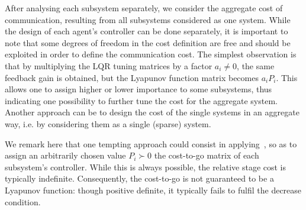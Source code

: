 \documentclass[letterpaper, 10 pt, conference]{ieeeconf}  %
\newtheorem{Proposition}[Theorem]{Propositon}
\begin{document}
After analysing each subsystem separately, we consider the aggregate cost of communication, resulting from all subsystems considered as one system. While the design of each agent's controller can be done separately, it is important to note that some degrees of freedom in the cost definition are free and should be exploited in order to define the communication cost. 
The simplest observation is that by multiplying the LQR tuning matrices by a factor $a_i \neq 0$, the same feedback gain is obtained, but the Lyapunov function matrix becomes $a_i P_i$. This allows one to assign higher or lower importance to some subsystems, thus indicating one possibility to further tune the cost for the aggregate system. Another approach can be to design the cost of the single systems in an aggregate way, i.e. by considering them as a single (sparse) system.

We remark here that one tempting approach could consist in applying~\cite[Lemma 2]{Zanon2014d}, so as to assign an arbitrarily chosen value $P_i \succ 0$ the cost-to-go matrix of each subsystem's controller. While this is always possible, the relative stage cost is typically indefinite.
Consequently, the cost-to-go is not guaranteed to be a Lyapunov function: though positive definite, it typically fails to fulfil the decrease condition.
\end{document}
